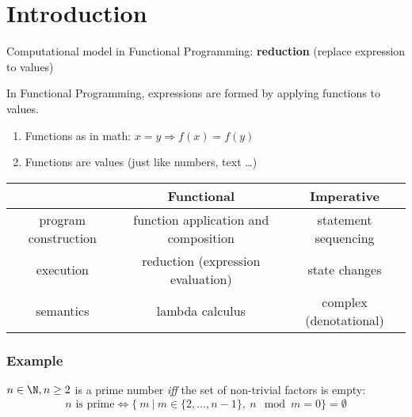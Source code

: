 

\chapter{Introduction} %
\label{cha:introduction}

Computational model in Functional Programming: \textbf{reduction} (replace expression to values)

In Functional Programming, expressions are formed by applying functions to values.

\begin{enumerate}
    \item Functions as in math: $x = y \Rightarrow f(x) = f(y)$
    \item Functions are values (just like numbers, text \dots)
\end{enumerate}

\vspace{9pt}\begin{center}\begin{tabular}{|c|c|c|}\hline
\rowcolor{grau}                         & Functional                                & Imperative        \\\hline
                program construction    & function application and composition      & statement sequencing      \\\hline
                execution               & reduction (expression evaluation)         & state changes             \\\hline
                semantics               & lambda calculus                           & complex (denotational)    \\\hline
\end{tabular}\end{center}\vspace{9pt}

\newpage

\subsection*{Example}
$n \in \N, n \ge 2 $ is a prime number \textit{iff} the set of non-trivial factors is empty:\\
$$ n \text{ is prime} \Leftrightarrow \{\ m\ |\ m \in \{2,\dots, n-1\},\ n \mod m = 0 \} = \emptyset $$
\\



